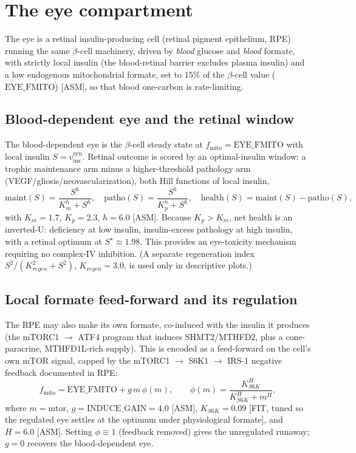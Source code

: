 \documentclass[11pt]{article}
\begin{document}
\section{The eye compartment}\label{sec:eye}

The eye is a retinal insulin-producing cell (retinal pigment epithelium, RPE)
running the same $\beta$-cell machinery, driven by \emph{blood} glucose and
\emph{blood} formate, with strictly local insulin (the blood-retinal barrier
excludes plasma insulin) and a low endogenous mitochondrial formate, set to
$15\%$ of the $\beta$-cell value ($\mathrm{EYE\_FMITO}$) [ASM], so that blood
one-carbon is rate-limiting.

\subsection{Blood-dependent eye and the retinal window}
The blood-dependent eye is the $\beta$-cell steady state at
$f_{\mathrm{mito}}=\mathrm{EYE\_FMITO}$ with local insulin
$S=v_{\mathrm{ins}}^{\mathrm{syn}}$. Retinal outcome is scored by an
optimal-insulin window: a trophic maintenance arm minus a higher-threshold
pathology arm (VEGF/gliosis/neovascularization), both Hill functions of local
insulin,
\begin{equation}
\mathrm{maint}(S)=\frac{S^{h}}{K_m^{h}+S^{h}},\quad
\mathrm{patho}(S)=\frac{S^{h}}{K_p^{h}+S^{h}},\quad
\mathrm{health}(S)=\mathrm{maint}(S)-\mathrm{patho}(S),
\end{equation}
with $K_m=1.7$, $K_p=2.3$, $h=6.0$ [ASM]. Because $K_p>K_m$, net health is an
inverted-U: deficiency at low insulin, insulin-excess pathology at high insulin,
with a retinal optimum at $S^\star\approx1.98$. This provides an eye-toxicity
mechanism requiring no complex-IV inhibition. (A separate regeneration index
$S^2/(K_{regen}^2+S^2)$, $K_{regen}=3.0$, is used only in descriptive plots.)

\subsection{Local formate feed-forward and its regulation}\label{sec:eyeff}
The RPE may also make its own formate, co-induced with the insulin it produces
(the mTORC1 $\to$ ATF4 program that induces SHMT2/\allowbreak MTHFD2, plus a cone-paracrine,
MTHFD1L-rich supply). This is encoded as a feed-forward on the cell's own
mTOR signal, capped by the mTORC1 $\to$ S6K1 $\to$ IRS-1 negative feedback documented
in RPE:
\begin{equation}
f_{\mathrm{mito}}=\mathrm{EYE\_FMITO}+g\,m\,\phi(m),\qquad
\phi(m)=\frac{K_{S6K}^{H}}{K_{S6K}^{H}+m^{H}},
\end{equation}
where $m=\mathrm{mtor}$, $g=\mathrm{INDUCE\_GAIN}=4.0$ [ASM], $K_{S6K}=0.09$ [FIT,
tuned so the regulated eye settles at the optimum under physiological formate], and
$H=6.0$ [ASM]. Setting $\phi\equiv1$ (feedback removed) gives the unregulated
runaway; $g=0$ recovers the blood-dependent eye.
\end{document}
